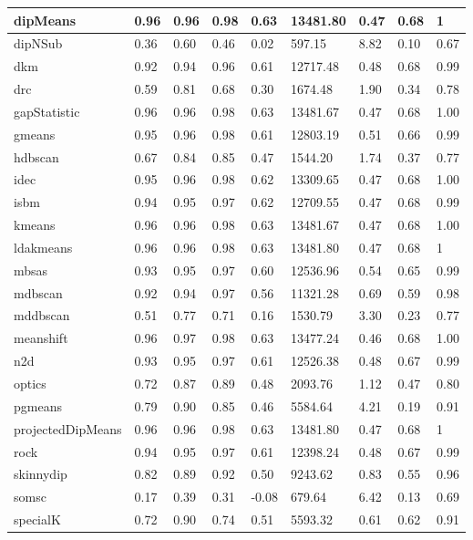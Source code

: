 \begin{table}[H]
\begin{tabular}{|l|l|l|l|l|l|l|l|l|}
\hline
dipMeans & 0.96 & 0.96 & 0.98 & 0.63 & 13481.80 & 0.47 & 0.68 & 1 \\
\hline
dipNSub & 0.36 & 0.60 & 0.46 & 0.02 & 597.15 & 8.82 & 0.10 & 0.67 \\
\hline
dkm & 0.92 & 0.94 & 0.96 & 0.61 & 12717.48 & 0.48 & 0.68 & 0.99 \\
\hline
drc & 0.59 & 0.81 & 0.68 & 0.30 & 1674.48 & 1.90 & 0.34 & 0.78 \\
\hline
gapStatistic & 0.96 & 0.96 & 0.98 & 0.63 & 13481.67 & 0.47 & 0.68 & 1.00 \\
\hline
gmeans & 0.95 & 0.96 & 0.98 & 0.61 & 12803.19 & 0.51 & 0.66 & 0.99 \\
\hline
hdbscan & 0.67 & 0.84 & 0.85 & 0.47 & 1544.20 & 1.74 & 0.37 & 0.77 \\
\hline
idec & 0.95 & 0.96 & 0.98 & 0.62 & 13309.65 & 0.47 & 0.68 & 1.00 \\
\hline
isbm & 0.94 & 0.95 & 0.97 & 0.62 & 12709.55 & 0.47 & 0.68 & 0.99 \\
\hline
kmeans & 0.96 & 0.96 & 0.98 & 0.63 & 13481.67 & 0.47 & 0.68 & 1.00 \\
\hline
ldakmeans & 0.96 & 0.96 & 0.98 & 0.63 & 13481.80 & 0.47 & 0.68 & 1 \\
\hline
mbsas & 0.93 & 0.95 & 0.97 & 0.60 & 12536.96 & 0.54 & 0.65 & 0.99 \\
\hline
mdbscan & 0.92 & 0.94 & 0.97 & 0.56 & 11321.28 & 0.69 & 0.59 & 0.98 \\
\hline
mddbscan & 0.51 & 0.77 & 0.71 & 0.16 & 1530.79 & 3.30 & 0.23 & 0.77 \\
\hline
meanshift & 0.96 & 0.97 & 0.98 & 0.63 & 13477.24 & 0.46 & 0.68 & 1.00 \\
\hline
n2d & 0.93 & 0.95 & 0.97 & 0.61 & 12526.38 & 0.48 & 0.67 & 0.99 \\
\hline
optics & 0.72 & 0.87 & 0.89 & 0.48 & 2093.76 & 1.12 & 0.47 & 0.80 \\
\hline
pgmeans & 0.79 & 0.90 & 0.85 & 0.46 & 5584.64 & 4.21 & 0.19 & 0.91 \\
\hline
projectedDipMeans & 0.96 & 0.96 & 0.98 & 0.63 & 13481.80 & 0.47 & 0.68 & 1 \\
\hline
rock & 0.94 & 0.95 & 0.97 & 0.61 & 12398.24 & 0.48 & 0.67 & 0.99 \\
\hline
skinnydip & 0.82 & 0.89 & 0.92 & 0.50 & 9243.62 & 0.83 & 0.55 & 0.96 \\
\hline
somsc & 0.17 & 0.39 & 0.31 & -0.08 & 679.64 & 6.42 & 0.13 & 0.69 \\
\hline
specialK & 0.72 & 0.90 & 0.74 & 0.51 & 5593.32 & 0.61 & 0.62 & 0.91 \\

\end{tabular}
\end{table}
